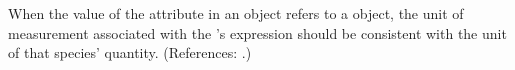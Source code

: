 When the value of the attribute  in an \InitialAssignment
object refers to a \Species object, the unit of measurement associated with
the \InitialAssignment's  expression should be consistent with
the unit of that species' quantity.  (References: .)
